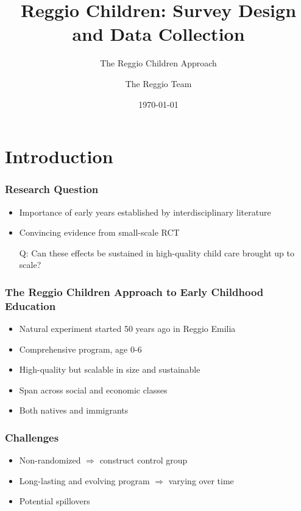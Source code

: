 \documentclass[xcolor=table]{beamer}
\title[Reggio Children Approach]{Reggio Children: Survey Design and Data Collection}
\subtitle{The Reggio Children Approach}
\author[ReggioTeam]{The Reggio Team}
\date{\today}
\begin{document}
\frame{\titlepage}


\section{Introduction}\label{sec:Intro}
\begin{frame}
\frametitle{Research Question} 
\begin{itemize}
	\item Importance of early years established by interdisciplinary literature
	\item Convincing evidence from small-scale RCT
	\vspace{2ex}
	\item[Q:] Can these effects be sustained in high-quality child care brought up to scale?
\end{itemize}
\end{frame}
\begin{frame}
\frametitle{The Reggio Children Approach to Early Childhood Education} 
\begin{itemize}
\item Natural experiment started 50 years ago in Reggio Emilia
\item Comprehensive program, age 0-6 
\item High-quality but scalable in size and sustainable
\item Span across social and economic classes
\item Both natives and immigrants

\vspace{4ex}

\end{itemize}
\end{frame} 
\begin{frame}
\frametitle{Challenges} 
\begin{itemize}
	\item Non-randomized $\Rightarrow$ construct control group
	\item Long-lasting and evolving program $\Rightarrow$ varying over time
	\item Potential spillovers
\end{itemize}
\end{frame}
\end{document}
